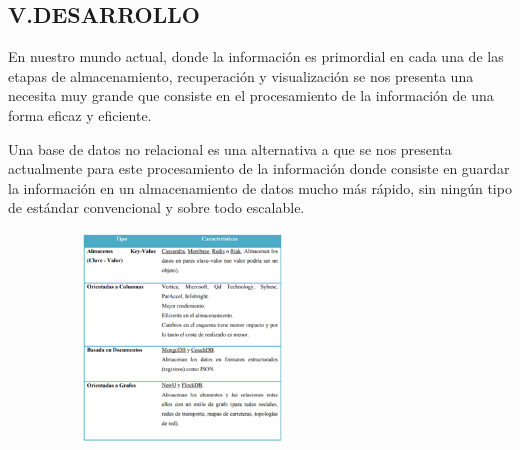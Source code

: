 \documentclass[12pt]{article}
\begin{document}
\begin{multicols}{2}

\par


\vspace{\baselineskip}\section*{ V.DESARROLLO}

\vspace{\baselineskip}
\begin{justify}
{\fontsize{9pt}{10.8pt}\selectfont En nuestro mundo actual, donde la información es primordial en cada una de las etapas de almacenamiento, recuperación y visualización se nos presenta una necesita muy grande que consiste en el procesamiento de la información de una forma eficaz y eficiente.\par}
\end{justify}\par

\begin{justify}
{\fontsize{9pt}{10.8pt}\selectfont Una base de datos no relacional es una alternativa a que se nos presenta actualmente para este procesamiento de la información donde consiste en guardar la información en un almacenamiento de datos mucho más rápido, sin ningún tipo de estándar convencional y sobre todo escalable.\par}
\end{justify}\par


\vspace{\baselineskip}



\begin{figure}[H]
	\begin{Center}
		\includegraphics[width=2.81in,height=2.19in]{./media/image5.png}
	\end{Center}
\end{figure}



\end{multicols}
\end{document}

